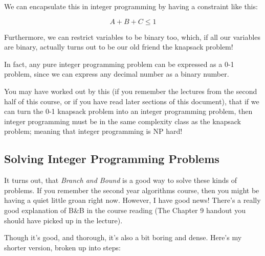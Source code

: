 We can encapsulate this in integer programming by having a constraint like this:

\[
  A + B + C \leq 1
\]

Furthermore, we can restrict variables to be binary too, which, if all our
variables are binary, actually turns out to be our old friend the knapsack
problem!

In fact, any pure integer programming problem can be expressed as a 0-1 problem,
since we can express any decimal number as a binary number.


You may have worked out by this (if you remember the lectures from the second
half of this course, or if you have read later sections of this document), that
if we can turn the 0-1 knapsack problem into an integer programming problem,
then integer programming must be in the same complexity class as the knapsack
problem; meaning that integer programming is NP hard!

\subsection{Solving Integer Programming Problems}

It turns out, that \textit{Branch and Bound} is a good way to solve these kinds
of problems. If you remember the second year algorithms course, then you might
be having a quiet little groan right now. However, I have good news! There's a
really good explanation of B\&B in the course reading (The Chapter 9 handout you
should have picked up in the lecture).

Though it's good, and thorough, it's also a bit boring and dense. Here's my
shorter version, broken up into steps:

